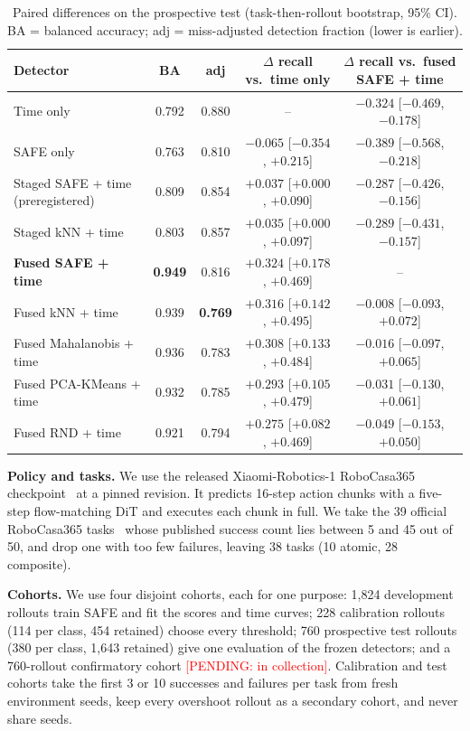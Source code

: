 \documentclass[conference,a4paper]{IEEEtran}
\newcommand{\pending}[1]{\textcolor{red}{[PENDING: #1]}}
\begin{document}
\begin{table}[t]
\centering
\caption{Paired differences on the prospective test (task-then-rollout bootstrap, 95\% CI).
BA = balanced accuracy; adj = miss-adjusted detection fraction (lower is earlier).}
\label{tab:main}
\footnotesize
\begin{tabular}{@{}lcccc@{}}
\toprule
Detector & BA & adj & $\Delta$ recall vs.\ time only & $\Delta$ recall vs.\ fused SAFE + time \\
\midrule
Time only & 0.792 & 0.880 & -- & $-0.324$ [$-0.469$, $-0.178$] \\
SAFE only & 0.763 & 0.810 & $-0.065$ [$-0.354$, $+0.215$] & $-0.389$ [$-0.568$, $-0.218$] \\
Staged SAFE + time (preregistered) & 0.809 & 0.854 & $+0.037$ [$+0.000$, $+0.090$] & $-0.287$ [$-0.426$, $-0.156$] \\
Staged kNN + time & 0.803 & 0.857 & $+0.035$ [$+0.000$, $+0.097$] & $-0.289$ [$-0.431$, $-0.157$] \\
\midrule
\textbf{Fused SAFE + time} & \textbf{0.949} & 0.816 & $\mathbf{+0.324}$ [$+0.178$, $+0.469$] & -- \\
Fused kNN + time & 0.939 & \textbf{0.769} & $+0.316$ [$+0.142$, $+0.495$] & $-0.008$ [$-0.093$, $+0.072$] \\
Fused Mahalanobis + time & 0.936 & 0.783 & $+0.308$ [$+0.133$, $+0.484$] & $-0.016$ [$-0.097$, $+0.065$] \\
Fused PCA-KMeans + time & 0.932 & 0.785 & $+0.293$ [$+0.105$, $+0.479$] & $-0.031$ [$-0.130$, $+0.061$] \\
Fused RND + time & 0.921 & 0.794 & $+0.275$ [$+0.082$, $+0.469$] & $-0.049$ [$-0.153$, $+0.050$] \\
\bottomrule
\end{tabular}
\end{table}


\textbf{Policy and tasks.} We use the released Xiaomi-Robotics-1 RoboCasa365
checkpoint~\cite{xiaomi2026robotics} at a pinned revision. It predicts 16-step action chunks
with a five-step flow-matching DiT and executes each chunk in full. We take the 39 official
RoboCasa365 tasks~\cite{nasiriany2024robocasa,robocasa365} whose published success count
lies between 5 and 45 out of 50, and drop one with too few failures, leaving 38 tasks
(10 atomic, 28 composite).



\textbf{Cohorts.} We use four disjoint cohorts, each for one purpose: 1,824 development rollouts train SAFE and fit the scores and time curves; 228 calibration rollouts (114 per class, 454 retained) choose every threshold; 760 prospective test rollouts (380 per class, 1,643 retained) give one evaluation of the frozen detectors; and a 760-rollout confirmatory cohort \pending{in collection}. Calibration and test cohorts take the first 3 or 10 successes and failures per task from fresh environment seeds, keep every overshoot rollout as a secondary cohort, and never share seeds.
\end{document}
